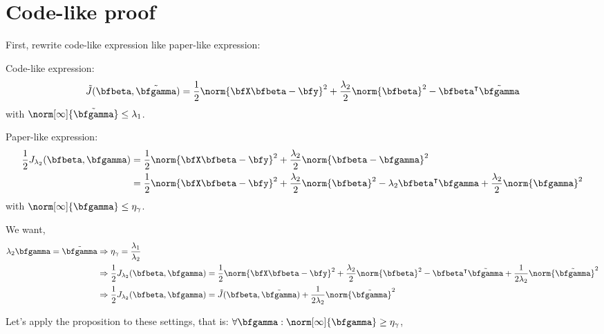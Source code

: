 \section{Code-like proof}


First, rewrite code-like expression like paper-like expression:

Code-like expression:
\[
 \tilde J(\bfbeta,\tilde\bfgamma) = \frac{1}{2} \norm{\bfX \bfbeta - \bfy}^2 + 
    \frac{\lambda_2}{2} \norm{\bfbeta}^2 - 
    \bfbeta^\intercal\tilde\bfgamma 
\]
with $\norm[\infty]{\tilde\bfgamma} \leq \lambda_1$.

Paper-like expression:
\begin{align*}
  \frac{1}{2} J_{\lambda_2}(\bfbeta,\bfgamma) & = 
    \frac{1}{2} \norm{\bfX \bfbeta - \bfy}^2 + 
    \frac{\lambda_2}{2} \norm{\bfbeta - \bfgamma}^2 \\
     & = 
    \frac{1}{2} \norm{\bfX \bfbeta - \bfy}^2 + 
    \frac{\lambda_2}{2} \norm{\bfbeta}^2 - 
    \lambda_2 \bfbeta^\intercal\bfgamma + 
    \frac{\lambda_2}{2} \norm{\bfgamma}^2 
\end{align*}
with $\norm[\infty]{\bfgamma} \leq \eta_\gamma$.


We want, 
\begin{align*}
   \lambda_2 \bfgamma = \tilde\bfgamma 
   & \Rightarrow
   \eta_\gamma = \frac{\lambda_1}{\lambda_2} \\
   & \Rightarrow
   \frac{1}{2} J_{\lambda_2}(\bfbeta,\bfgamma) = \frac{1}{2} \norm{\bfX \bfbeta - \bfy}^2 + 
    \frac{\lambda_2}{2} \norm{\bfbeta}^2 - 
    \bfbeta^\intercal\tilde\bfgamma + 
    \frac{1}{2\lambda_2} \norm{\tilde\bfgamma}^2 \\
   & \Rightarrow
   \frac{1}{2} J_{\lambda_2}(\bfbeta,\bfgamma) = \tilde J(\bfbeta,\tilde\bfgamma) + \frac{1}{2\lambda_2} \norm{\tilde\bfgamma}^2
\end{align*}

Let's apply the proposition to these settings, that is: $\forall \bfgamma: \norm[\infty]{\bfgamma} \geq \eta_\gamma$,


